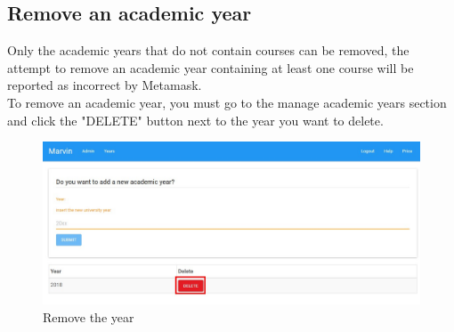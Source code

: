 \documentclass[ManualeUtente]{subfiles}
\begin{document}
\subsection{Remove an academic year}
Only the academic years that do not contain courses can be removed, the attempt to remove an academic year containing at least one course will be reported as incorrect by Metamask.\\
To remove an academic year, you must go to the manage academic years section and click the "DELETE" button next to the year you want to delete.
\begin{figure}[H]
	\centering
	\includegraphics[width=0.7\linewidth]{image/UniversityRemoveYear1}
	\caption[Add year form]{Remove the year}
	\label{fig:Remove the year}
\end{figure}
\end{document}
